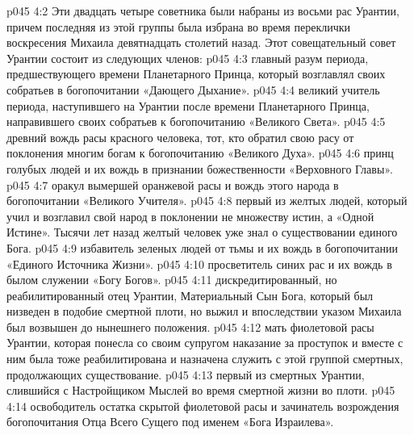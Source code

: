 \vs p045 4:2 Эти двадцать четыре советника были набраны из восьми рас Урантии, причем последняя из этой группы была избрана во время переклички воскресения Михаила девятнадцать столетий назад. Этот совещательный совет Урантии состоит из следующих членов:
\vs p045 4:3 \bibnobreakspace {} главный разум периода, предшествующего времени Планетарного Принца, который возглавлял своих собратьев в богопочитании «Дающего Дыхание».
\vs p045 4:4 \pc {}\bibnobreakspace {} великий учитель периода, наступившего на Урантии после времени Планетарного Принца, направившего своих собратьев к богопочитанию «Великого Света».
\vs p045 4:5 \pc {}\bibnobreakspace {} древний вождь расы красного человека, тот, кто обратил свою расу от поклонения многим богам к богопочитанию «Великого Духа».
\vs p045 4:6 \pc {}\bibnobreakspace {} принц голубых людей и их вождь в признании божественности «Верховного Главы».
\vs p045 4:7 \pc {}\bibnobreakspace {} оракул вымершей оранжевой расы и вождь этого народа в богопочитании «Великого Учителя».
\vs p045 4:8 \pc {}\bibnobreakspace {} первый из желтых людей, который учил и возглавил свой народ в поклонении не множеству истин, а «Одной Истине». Тысячи лет назад желтый человек уже знал о существовании единого Бога.
\vs p045 4:9 \pc {}\bibnobreakspace {} избавитель зеленых людей от тьмы и их вождь в богопочитании «Единого Источника Жизни».
\vs p045 4:10 \pc {}\bibnobreakspace {} просветитель синих рас и их вождь в былом служении «Богу Богов».
\vs p045 4:11 \pc {}\bibnobreakspace {} дискредитированный, но реабилитированный отец Урантии, Материальный Сын Бога, который был низведен в подобие смертной плоти, но выжил и впоследствии указом Михаила был возвышен до нынешнего положения.
\vs p045 4:12 \pc {}\bibnobreakspace {} мать фиолетовой расы Урантии, которая понесла со своим супругом наказание за проступок и вместе с ним была тоже реабилитирована и назначена служить с этой группой смертных, продолжающих существование.
\vs p045 4:13 \pc {}\bibnobreakspace {} первый из смертных Урантии, слившийся с Настройщиком Мыслей во время смертной жизни во плоти.
\vs p045 4:14 \pc {}\bibnobreakspace {} освободитель остатка скрытой фиолетовой расы и зачинатель возрождения богопочитания Отца Всего Сущего под именем «Бога Израилева».
